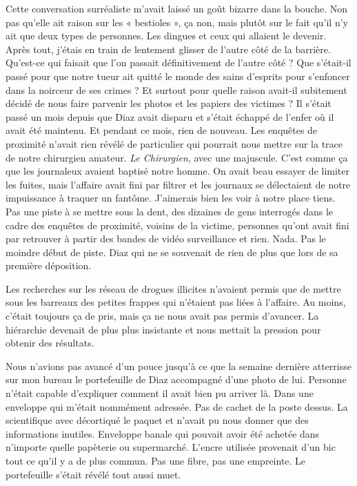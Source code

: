 Cette conversation surréaliste m'avait laissé un goût bizarre dans la bouche. Non pas qu'elle ait raison sur les 
« bestioles », ça non, mais plutôt sur le fait qu'il n'y ait que deux types de personnes. Les dingues et ceux qui 
allaient le devenir. Après tout, j'étais en train de lentement glisser de l'autre côté de la barrière. Qu'est-ce qui 
faisait que l'on passait définitivement de l'autre côté ? Que s'était-il passé pour que notre tueur ait quitté le monde 
des sains d'esprits pour s'enfoncer dans la noirceur de ses crimes ? Et surtout pour quelle raison avait-il subitement 
décidé de nous faire parvenir les photos et les papiers des victimes ? Il s'était passé un mois depuis que Diaz avait 
disparu et s'était échappé de l'enfer où il avait été maintenu. Et pendant ce mois, rien de nouveau. Les enquêtes de 
proximité n'avait rien révélé de particulier qui pourrait nous mettre sur la trace de notre chirurgien amateur. \emph{Le 
Chirurgien}, avec une majuscule. C'est comme ça que les journaleux avaient baptisé notre homme. On avait beau essayer de 
limiter les fuites, mais l'affaire avait fini par filtrer et les journaux se délectaient de notre impuissance à traquer 
un fantôme. J'aimerais bien les voir à notre place tiens. Pas une piste à se mettre sous la dent, des dizaines de gens 
interrogés dans le cadre des enquêtes de proximité, voisins de la victime, personnes qu'ont avait fini par retrouver à 
partir des bandes de vidéo surveillance et rien. Nada. Pas le moindre début de piste. Diaz qui ne se souvenait de rien 
de plus que lors de sa première déposition.

Les recherches sur les réseau de drogues illicites n'avaient permis que de mettre sous les barreaux des petites frappes 
qui n'étaient pas liées à l'affaire. Au moins, c'était toujours ça de pris, mais ça ne nous avait pas permis d'avancer. 
La hiérarchie devenait de plus plus insistante et nous mettait la pression pour obtenir des résultats.

Nous n'avions pas avancé d'un pouce jusqu'à ce que la semaine dernière atterrisse sur mon bureau le portefeuille de 
Diaz accompagné d'une photo de lui. Personne n'était capable d'expliquer comment il avait bien pu arriver là. Dans une 
enveloppe qui m'était nommément adressée. Pas de cachet de la poste dessus. La scientifique avec décortiqué le paquet 
et n'avait pu nous donner que des informations inutiles. Enveloppe banale qui pouvait avoir été achetée dans n'importe 
quelle papèterie ou supermarché. L'encre utilisée provenait d'un bic tout ce qu'il y a de plus commun.  Pas une fibre, 
pas une empreinte. Le portefeuille s'était révélé tout aussi muet.


